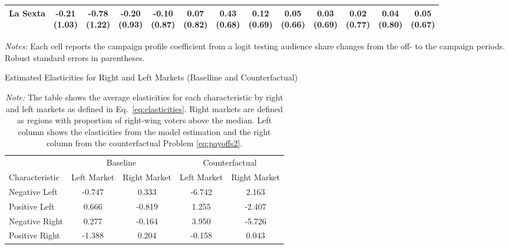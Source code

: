 \documentclass[12pt]{article}
\begin{document}
\begin{table}[!htbp]
\begin{threeparttable}
\begin{tabular}{lcccccccccc|cc}
		La Sexta & \shortstack{-0.21\\(1.03)} & \shortstack{-0.78\\(1.22)} & \shortstack{-0.20\\(0.93)} & \shortstack{-0.10\\(0.87)} & \shortstack{0.07\\(0.82)} & \shortstack{0.43\\(0.68)} & \shortstack{0.12\\(0.69)} & \shortstack{0.05\\(0.66)} & \shortstack{0.03\\(0.69)} & \shortstack{0.02\\(0.77)} & \shortstack{0.04\\(0.80)} & \shortstack{0.05\\(0.67)} \\
		\bottomrule
	\end{tabular}
	\begin{tablenotes}\footnotesize
		\item \textit{Notes:} Each cell reports the campaign profile coefficient from a logit testing audience share changes from the off- to the campaign periods. Robust standard errors in parentheses. 
	\end{tablenotes}
\end{threeparttable}
\end{table}






\begin{table}[!htb]
\centering
\caption{Estimated Elasticities for Right and Left Markets (Baselline and Counterfactual)}
\begin{tabular}{l|cc|cc}
	\toprule
	& \multicolumn{2}{c|}{Baseline} & \multicolumn{2}{c}{Counterfactual} \\
	Characteristic & Left Market & Right Market & Left Market & Right Market \\
	\midrule
	Negative Left & -0.747 & 0.333 & -6.742 & 2.163 \\
	Positive Left & 0.666 & -0.819 & 1.255 & -2.407 \\
	Negative Right & 0.277 & -0.164 & 3.950 & -5.726 \\
	Positive Right & -1.388 & 0.204 & -0.158 & 0.043 \\
	\bottomrule
\end{tabular}
\caption*{\textit{Note:} \small The table shows the average elasticities for each characteristic by right and left markets as defined in Eq.~\eqref{eq:elasticities}. Right markets are defined as regions with proportion of right-wing voters above the median. Left column shows the elasticities from the model estimation and the right column from the counterfactual Problem \eqref{eq:payoffs2}.}
\label{tab:elasticities_count}
\end{table}
\end{document}
